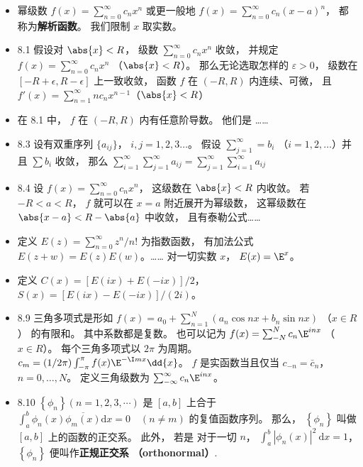 \begin{itemize}
\item 幂级数 $f(x) = \sum_{n=0}^\infty c_n x^n$ 或更一般地 $f(x) = \sum_{n=0}^\infty c_n (x-a)^n$， 都称为\textbf{解析函数}。 我们限制 $x$ 取实数。

\item 8.1 假设对 $\abs{x}<R$， 级数 $\sum_{n=0}^\infty c_n x^n$ 收敛， 并规定 $f(x) = \sum_{n=0}^\infty c_n x^n$ （$\abs{x}<R$）。 那么无论选取怎样的 $\varepsilon >0$， 级数在 $[-R+\epsilon, R-\epsilon]$ 上一致收敛， 函数 $f$ 在 $(-R,R)$ 内连续、可微， 且 $f'(x)=\sum_{n=1}^\infty nc_n x^{n-1}$（$\abs{x}<R$）

\item 在 8.1 中， $f$ 在 $(-R,R)$ 内有任意阶导数。 他们是 ……

\item 8.3 设有双重序列 $\{a_{ij}\}$， $i,j=1,2,3\dots$。 假设 $\sum_{j=1}^\infty = b_i$ （$i=1,2,\dots$）并且 $\sum b_i$ 收敛， 那么 $\sum_{i=1}^\infty\sum_{j=1}^\infty a_{ij} = \sum_{j=1}^\infty\sum_{i=1}^\infty a_{ij}$

\item 8.4 设 $f(x)=\sum_{n=0}^\infty c_nx^n$， 这级数在 $\abs{x}<R$ 内收敛。 若 $-R<a<R$， $f$ 就可以在 $x=a$ 附近展开为幂级数， 这幂级数在 $\abs{x-a}<R-\abs{a}$ 中收敛， 且有泰勒公式……

\item 定义 $E(z) = \sum_{n=0}^\infty z^n/n!$ 为指数函数， 有加法公式 $E(z+w)=E(z)E(w)$。……  对一切实数 $x$， $E(x)=\E^x$。

\item 定义 $C(x) = [E(ix)+E(-ix)]/2$， $S(x)=[E(ix)-E(-ix)]/(2i)$。

\item 8.9 三角多项式是形如 $f(x) = a_0 + \sum_{n=1}^N (a_n\cos nx + b_n \sin nx)$ （$x\in R$） 的有限和。 其中系数都是复数。 也可以记为 $f(x) = \sum_{-N}^N c_n \E^{inx}$ （$x\in R$）。 每个三角多项式以 $2\pi$ 为周期。 $c_m = (1/2\pi) \int_{-\pi}^{\pi} f(x)\E^{-\I mx}\dd{x}$。 $f$ 是实函数当且仅当 $c_{-n} = \bar c_n$， $n=0,\dots,N$。 定义三角级数为 $\sum_{-\infty}^\infty c_n \E^{inx}$。

\item 8.10 $\left\{\phi_{n}\right\}(n=1,2,3, \cdots)$ 是 $[a, b]$ 上合于 $\int_{a}^{b} \phi_{n}(x) \overline{\phi_{m}(x)} \mathrm{d} x=0 \quad(n \neq m)$ 的复值函数序列。 那么， $\left\{\phi_{n}\right\}$ 叫做 $[a, b]$ 上的函数的正交系。 此外， 若是 对于一切 $n$， $\int_{a}^{b}\left|\phi_{n}(x)\right|^{2} \mathrm{~d} x=1$， $\left\{\phi_{n}\right\}$ 便叫作\textbf{正规正交系 （orthonormal）}.


\end{itemize}
